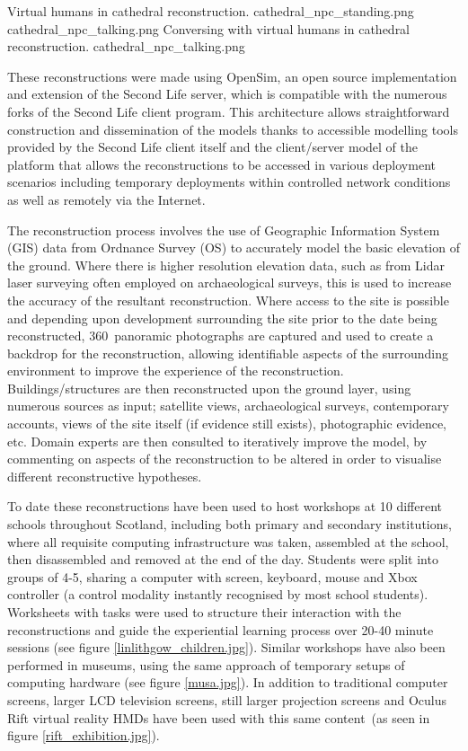  {Virtual humans in cathedral reconstruction.} {cathedral_npc_standing.png}
       {cathedral_npc_talking.png} {Conversing with virtual humans in cathedral reconstruction.} {cathedral_npc_talking.png}

These reconstructions were made using OpenSim, an open source implementation and extension of the Second Life server, which is compatible with the numerous forks of the Second Life client program. This architecture allows straightforward construction and dissemination of the models thanks to accessible modelling tools provided by the Second Life client itself and the client/server model of the platform that allows the reconstructions to be accessed in various deployment scenarios including temporary deployments within controlled network conditions as well as remotely via the Internet.

The reconstruction process involves the use of Geographic Information System (GIS) data from Ordnance Survey (OS) to accurately model the basic elevation of the ground. Where there is higher resolution elevation data, such as from Lidar laser surveying often employed on archaeological surveys, this is used to increase the accuracy of the resultant reconstruction. Where access to the site is possible and depending upon development surrounding the site prior to the date being reconstructed, 360\textdegree\ panoramic photographs are captured and used to create a backdrop for the reconstruction, allowing identifiable aspects of the surrounding environment to improve the experience of the reconstruction. Buildings/structures are then reconstructed upon the ground layer, using numerous sources as input; satellite views, archaeological surveys, contemporary accounts, views of the site itself (if evidence still exists), photographic evidence, etc. Domain experts are then consulted to iteratively improve the model, by commenting on aspects of the reconstruction to be altered in order to visualise different reconstructive hypotheses.

To date these reconstructions have been used to host workshops at 10 different schools throughout Scotland, including both primary and secondary institutions, where all requisite computing infrastructure was taken, assembled at the school, then disassembled and removed at the end of the day. Students were split into groups of 4-5, sharing a computer with screen, keyboard, mouse and Xbox controller (a control modality instantly recognised by most school students). Worksheets with tasks were used to structure their interaction with the reconstructions and guide the experiential learning process over 20-40 minute sessions (see figure \ref{linlithgow_children.jpg}). Similar workshops have also been performed in museums, using the same approach of temporary setups of computing hardware (see figure \ref{musa.jpg}). In addition to traditional computer screens, larger LCD television screens, still larger projection screens and Oculus Rift virtual reality HMDs have been used with this same content~(as seen in figure \ref{rift_exhibition.jpg}).


